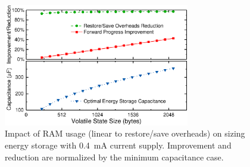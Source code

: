 \begin{figure}[!t]
    \centering
    \includegraphics[width=3.2in]{ch3_sizingeffect/figures/RSTORAM3Fig}
    \caption{Impact of RAM usage (linear to restore/save overheads) on sizing energy storage with \SI{0.4}{\milli\ampere} current supply. Improvement and reduction are normalized by the minimum capacitance case. }
    \label{fig:ram}
\end{figure}

